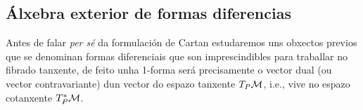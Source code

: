\subsection{Álxebra exterior de formas diferencias}
Antes de falar \textit{per sé} da formulación de Cartan estudaremos uns obxectos previos que se denominan formas diferenciais que son imprescindibles para traballar no fibrado tanxente, de feito unha 1-forma será precisamente o vector dual (ou vector contravariante) dun vector do espazo tanxente $T_P\mathcal{M}$, i.e., vive no espazo cotanxente $T_P^*\mathcal{M}$.

